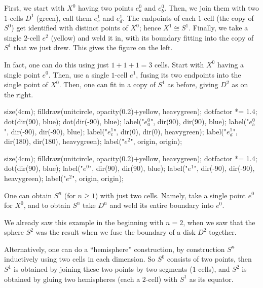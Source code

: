\documentclass[11pt]{scrreprt}
\begin{document}
\begin{example}
	\listhack
	\begin{enumerate}[(a)]
	\ii First, we start with $X^0$ having two points $e_a^0$ and $e_b^0$.
	Then, we join them with two $1$-cells $D^1$ (green),
	call them $e_c^1$ and $e_d^1$.
	The endpoints of each $1$-cell (the copy of $S^0$) get identified
	with distinct points of $X^0$; hence $X^1 \cong S^1$.
	Finally, we take a single $2$-cell $e^2$ (yellow) and weld it in,
	with its boundary fitting into the copy of $S^1$ that we just drew.
	This gives the figure on the left.

	\ii In fact, one can do this using just $1+1+1=3$ cells.
	Start with $X^0$ having a single point $e^0$.
	Then, use a single $1$-cell $e^1$, fusing its two endpoints
	into the single point of $X^0$.
	Then, one can fit in a copy of $S^1$ as before,
	giving $D^2$ as on the right.
	\end{enumerate}
	\begin{center}
		\begin{asy}
			size(4cm);
			filldraw(unitcircle, opacity(0.2)+yellow, heavygreen);
			dotfactor *= 1.4;
			dot(dir(90), blue);
			dot(dir(-90), blue);
			label("$e_a^0$", dir(90), dir(90), blue);
			label("$e_b^0$", dir(-90), dir(-90), blue);
			label("$e_c^1$", dir(0), dir(0), heavygreen);
			label("$e_d^1$", dir(180), dir(180), heavygreen);
			label("$e^2$", origin, origin);
		\end{asy}
		\qquad
		\begin{asy}
			size(4cm);
			filldraw(unitcircle, opacity(0.2)+yellow, heavygreen);
			dotfactor *= 1.4;
			dot(dir(90), blue);
			label("$e^0$", dir(90), dir(90), blue);
			label("$e^1$", dir(-90), dir(-90), heavygreen);
			label("$e^2$", origin, origin);
		\end{asy}
	\end{center}
\end{example}

\begin{example}
	[$S^n$ as a CW Complex]
	\listhack
	\begin{enumerate}[(a)]
		\ii One can obtain $S^n$ (for $n \ge 1$) with just two cells.
		Namely, take a single point $e^0$ for $X^0$, and to obtain $S^n$
		take $D^n$ and weld its entire boundary into $e^0$.

		We already saw this example in the beginning with $n=2$,
		when we saw that the sphere $S^2$ was the result when we fuse
		the boundary of a disk $D^2$ together.
		
		\ii Alternatively, one can do a ``hemisphere'' construction,
		by construction $S^n$ inductively using two cells in each dimension.
		So $S^0$ consists of two points, then $S^1$ is obtained
		by joining these two points by two segments ($1$-cells),
		and $S^2$ is obtained by gluing two hemispheres (each a $2$-cell)
		with $S^1$ as its equator.
	\end{enumerate}
\end{example}
\end{document}
